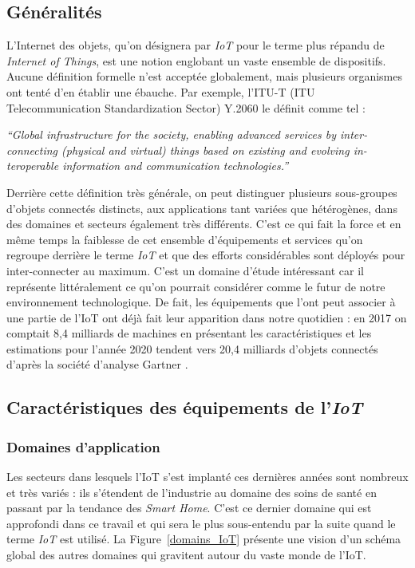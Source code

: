 \documentclass[]{article}
\begin{document}
\subsection{Généralités}

\par L'Internet des objets, qu'on désignera par \textit{IoT} pour le terme plus répandu de \textit{Internet of Things}, est une notion englobant un vaste ensemble de dispositifs. Aucune définition formelle n'est acceptée globalement, mais plusieurs organismes ont tenté d'en établir une ébauche. Par exemple, l'ITU-T (ITU Telecommunication Standardization Sector) Y.2060 le définit comme tel : 
\begin{center}
\textit{“Global  infrastructure  for  the  society,  enabling  advanced  services  by  inter-connecting (physical and virtual) things based on existing and evolving in-teroperable information and communication technologies.”}
\end{center}

\par Derrière cette définition très générale, on peut distinguer plusieurs sous-groupes d'objets connectés distincts, aux applications tant variées que hétérogènes, dans des domaines et secteurs également très différents. C'est ce qui fait la force et en même temps la faiblesse de cet ensemble d'équipements et services qu'on regroupe derrière le terme \textit{IoT} et que des efforts considérables sont déployés pour inter-connecter au maximum. C'est un domaine d'étude intéressant car il représente littéralement ce qu'on pourrait considérer comme le futur de notre environnement technologique. De fait, les équipements que l'ont peut associer à une partie de l'IoT ont déjà fait leur apparition dans notre quotidien : en 2017 on comptait 8,4 milliards de machines en présentant les caractéristiques et les estimations pour l'année 2020 tendent vers 20,4 milliards d'objets connectés d'après la société d'analyse Gartner \cite{Berte2018}.  
\subsection{Caractéristiques des équipements de l'\textit{IoT}}

\subsubsection{Domaines d'application}

Les secteurs dans lesquels l'IoT s'est implanté ces dernières années sont nombreux et très variés : ils s'étendent de l'industrie au domaine des soins de santé en passant par la tendance des \textit{Smart Home}. C'est ce dernier domaine qui est approfondi dans ce travail et qui sera le plus sous-entendu par la suite quand le terme \textit{IoT} est utilisé. La Figure~\ref{domains_IoT} présente une vision d'un schéma global des autres domaines qui gravitent autour du vaste monde de l'IoT.\\
\end{document}
